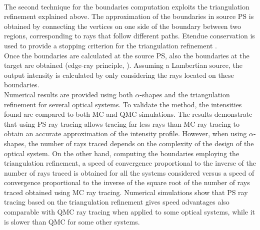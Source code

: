 \\ \indent The second technique for the boundaries computation exploits the triangulation refinement explained above. The approximation of the boundaries in source PS is obtained by connecting the vertices on one side of the boundary between two regions, corresponding to rays that follow different paths.
Etendue conservation is used to provide a stopping criterion for the triangulation refinement \cite{filosa2016ray, filosa2017phase}.  
\\\indent
Once the boundaries are calculated at the source PS, also the boundaries at the target are obtained (edge-ray principle, \cite{Ries:2}). Assuming a Lambertian source, the output intensity is calculated by only considering the rays located on these boundaries. 
\\ \indent 
Numerical results are provided using both $\alpha$-shapes and the triangulation refinement for several optical systems.
To validate the method, the intensities found are compared to both MC and QMC simulations. The results demonstrate that using PS ray tracing allows tracing far less rays than MC ray tracing to obtain an accurate approximation of the intensity profile. However, when using $\alpha$-shapes, the number of rays traced depends on the complexity of the design of the optical system. On the other hand, computing the boundaries employing the triangulation refinement, a speed of convergence proportional to the inverse of the number of rays traced is obtained for all the systems considered versus a speed of convergence proportional to the inverse of the square root of the number of rays traced obtained using MC ray tracing. Numerical simulations show that PS ray tracing based on the triangulation refinement gives speed advantages also comparable with QMC ray tracing when applied to some optical systems, while it is slower than QMC for some other systems.
